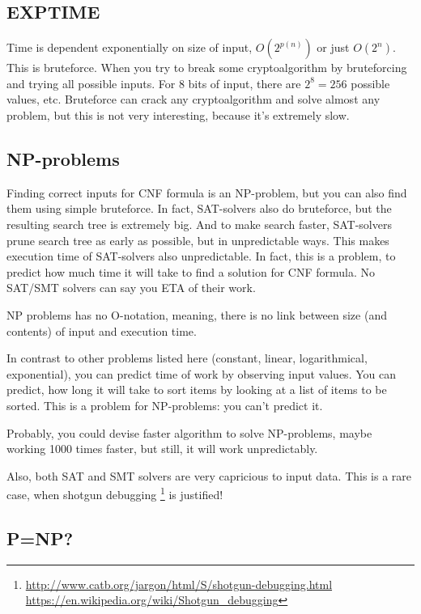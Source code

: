 \subsection{EXPTIME}

Time is dependent exponentially on size of input, $O(2^{p(n)})$ or just $O(2^n)$.
This is bruteforce.
When you try to break some cryptoalgorithm by bruteforcing and trying all possible inputs.
For 8 bits of input, there are $2^8=256$ possible values, etc.
Bruteforce can crack any cryptoalgorithm and solve almost any problem, but this is not very interesting, because it's extremely slow.

\subsection{NP-problems}

Finding correct inputs for CNF formula is an NP-problem, but you can also find them using simple bruteforce.
In fact, SAT-solvers also do bruteforce, but the resulting search tree is extremely big.
And to make search faster, SAT-solvers prune search tree as early as possible, but in unpredictable ways.
This makes execution time of SAT-solvers also unpredictable.
In fact, this is a problem, to predict how much time it will take to find a solution for CNF formula.
No SAT/SMT solvers can say you \ac{ETA} of their work.

NP problems has no O-notation, meaning, there is no link between size (and contents) of input and execution time.

In contrast to other problems listed here (constant, linear, logarithmical, exponential), you can predict time of work by observing
input values.
You can predict, how long it will take to sort items by looking at a list of items to be sorted.
This is a problem for NP-problems: you can't predict it.

Probably, you could devise faster algorithm to solve NP-problems, maybe working 1000 times faster, but still, it will work unpredictably.

Also, both SAT and SMT solvers are very capricious to input data.
This is a rare case, when shotgun debugging
\footnote{\url{http://www.catb.org/jargon/html/S/shotgun-debugging.html} \url{https://en.wikipedia.org/wiki/Shotgun_debugging}}
is justified!

\subsection{P=NP?}

